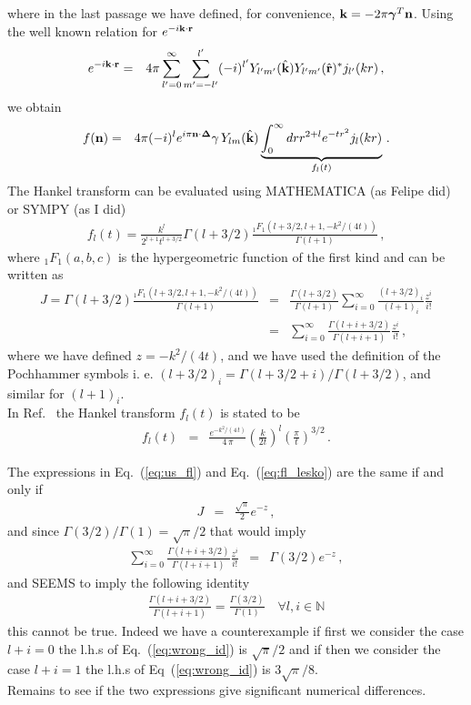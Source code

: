 	where in the last passage we have defined, for convenience, ${\bf k}=-2\pi{\bm \gamma}^T{\bf n}$. Using the well known relation for $e^{-i{\bf k}\cdot{\bf r}}$
	\begin{eqnarray}
	e^{-i{\bf k}\cdot{\bf r}}&=&4\pi\sum_{l^\prime=0}^{\infty}\sum_{m^\prime=-l^\prime}^{l^\prime}(-i)^{l^\prime}Y_{l^\prime m^\prime}({\hat {\bf k}})Y_{l^\prime m^\prime}(\hat{{\bf r}})^*j_{l^\prime}(kr)\, ,
	\end{eqnarray}
	we obtain
	\begin{eqnarray}
	f({\bf n})&=&4\pi (-i)^le^{i\pi{\bf n}\cdot{\bf\Delta}}\gamma\, Y_{lm}(\hat{{\bf k}})\underbrace{\int_0^\infty dr r^{2+l} e^{-tr^2}j_l(kr)}_{f_l(t)}\, .\label{eq:fn_final}
	\end{eqnarray}
	{\color{red}
	The Hankel transform can be evaluated using MATHEMATICA (as Felipe did) or SYMPY (as I did)
	\begin{eqnarray}
	f_l(t)=\frac{k^l}{2^{l+1}t^{l+3/2}}\Gamma(l+3/2)\frac{_1F_1(l+3/2,l+1,-k^2/(4t))}{\Gamma(l+1)}\, ,\label{eq:us_fl}
	\end{eqnarray}
	where $_1F_1(a,b,c)$ is the hypergeometric function of the first kind and can be written as
	\begin{eqnarray}
J=\Gamma(l+3/2)\frac{_1F_1(l+3/2,l+1,-k^2/(4t))}{\Gamma(l+1)}&=&\frac{\Gamma(l+3/2)}{\Gamma(l+1)}\sum_{i=0}^{\infty}\frac{(l+3/2)_i}{(l+1)_i}\frac{z^i}{i!}\nonumber\\
&=&\sum_{i=0}^{\infty}\frac{\Gamma(l+i+3/2)}{\Gamma(l+i+1)}\frac{z^i}{i!}\, ,
	\end{eqnarray}
where we have defined $z=-k^2/(4t)$, and we have used the definition of the Pochhammer symbols i. e. $(l+3/2)_i=\Gamma(l+3/2+i)/\Gamma(l+3/2)$, and similar for $(l+1)_i$.}\\
	In Ref.~\cite{Leskovec:2012gb} the Hankel transform $f_l(t)$ is stated to be
\begin{eqnarray}
f_l(t)&=&\frac{e^{-k^2/(4\,t)}}{4\,\pi}\left(\frac{k}{2t}\right)^l\left(\frac{\pi}{t}\right)^{3/2}\, .\label{eq:fl_lesko}
\end{eqnarray}
{\color{red}
The expressions in Eq.~(\ref{eq:us_fl}) and Eq.~(\ref{eq:fl_lesko}) are the same if and only if
\begin{eqnarray}
J&=&\frac{\sqrt{\pi}}{2}e^{-z}\, ,
\end{eqnarray}
and since $\Gamma(3/2)/\Gamma(1)=\sqrt{\pi}/2$ that would imply 
\begin{eqnarray}
\sum_{i=0}^{\infty}\frac{\Gamma(l+i+3/2)}{\Gamma(l+i+1)}\frac{z^i}{i!}&=&\Gamma(3/2)e^{-z}\, ,
\end{eqnarray}
and SEEMS to imply the following identity
\begin{eqnarray}
\frac{\Gamma(l+i+3/2)}{\Gamma(l+i+1)}=\frac{\Gamma(3/2)}{\Gamma(1)} \quad \forall l,i\in \mathbb{N}\label{eq:wrong_id}
\end{eqnarray}
this cannot be true. Indeed we have a counterexample if first we consider the case $l+i=0$ the l.h.s of Eq.~(\ref{eq:wrong_id}) is $\sqrt{\pi}/2$ and if then we consider the case $l+i=1$ the l.h.s of Eq~(\ref{eq:wrong_id}) is $3\sqrt{\pi}/8$.\\ Remains to see if the two expressions give significant numerical differences.

}
